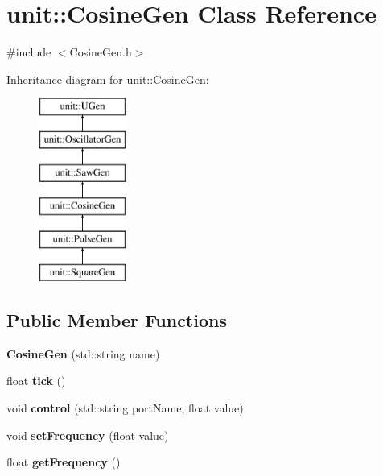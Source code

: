 \hypertarget{classunit_1_1CosineGen}{\section{unit\-:\-:Cosine\-Gen Class Reference}
\label{classunit_1_1CosineGen}
}


{\ttfamily \#include $<$Cosine\-Gen.\-h$>$}

Inheritance diagram for unit\-:\-:Cosine\-Gen\-:\begin{figure}[H]
\begin{center}
\leavevmode
\includegraphics[height=6.000000cm]{classunit_1_1CosineGen}
\end{center}
\end{figure}
\subsection*{Public Member Functions}
\begin{DoxyCompactItemize}
\item 
\hypertarget{classunit_1_1CosineGen_a1eb4aa0471f337e95653d91e550f58cb}{{\bfseries Cosine\-Gen} (std\-::string name)}\label{classunit_1_1CosineGen_a1eb4aa0471f337e95653d91e550f58cb}

\item 
\hypertarget{classunit_1_1CosineGen_a4c1ceffaf70b5eae5c4153ee4b93c001}{float {\bfseries tick} ()}\label{classunit_1_1CosineGen_a4c1ceffaf70b5eae5c4153ee4b93c001}

\item 
\hypertarget{classunit_1_1CosineGen_a15411f97b09516de2bf85327615f1784}{void {\bfseries control} (std\-::string port\-Name, float value)}\label{classunit_1_1CosineGen_a15411f97b09516de2bf85327615f1784}

\item 
\hypertarget{classunit_1_1CosineGen_aebdf5bbd7a0614f3a3cd2ae0d8602b32}{void {\bfseries set\-Frequency} (float value)}\label{classunit_1_1CosineGen_aebdf5bbd7a0614f3a3cd2ae0d8602b32}

\item 
\hypertarget{classunit_1_1CosineGen_a2865a158e86e8e85ac2c4d686de65fce}{float {\bfseries get\-Frequency} ()}\label{classunit_1_1CosineGen_a2865a158e86e8e85ac2c4d686de65fce}

\end{DoxyCompactItemize}
